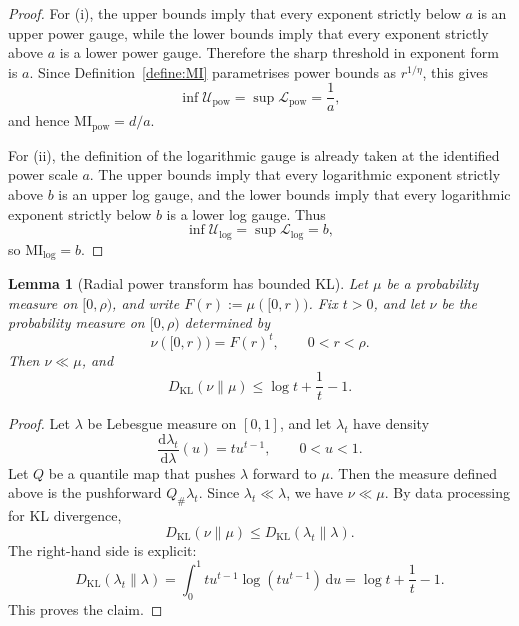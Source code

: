 \documentclass[11pt,a4paper]{article}
\newcommand{\MI}{\mathrm{MI}}
\theoremstyle{compactplain}
\newtheorem{lemma}[theorem]{Lemma}
\theoremstyle{compactdefinition}
\numberwithin{equation}{section}
\begin{document}
\begin{proof}
For \textnormal{(i)}, the upper bounds imply that every exponent strictly below
\(a\) is an upper power gauge, while the lower bounds imply that every exponent
strictly above \(a\) is a lower power gauge. Therefore the sharp threshold in
exponent form is \(a\). Since Definition~\ref{define:MI} parametrises power
bounds as \(r^{1/\eta}\), this gives
\[
 \inf\mathcal U_{\mathrm{pow}}=\sup\mathcal L_{\mathrm{pow}}=\frac1a,
\]
and hence \(\MI_{\mathrm{pow}}=d/a\).

For \textnormal{(ii)}, the definition of the logarithmic gauge is already taken
at the identified power scale \(a\). The upper bounds imply that every
logarithmic exponent strictly above \(b\) is an upper log gauge, and the lower
bounds imply that every logarithmic exponent strictly below \(b\) is a lower log
gauge. Thus
\[
 \inf\mathcal U_{\mathrm{log}}=\sup\mathcal L_{\mathrm{log}}=b,
\]
so \(\MI_{\mathrm{log}}=b\).
\end{proof}

\begin{lemma}[Radial power transform has bounded KL]
\label{lem:radial-power-kl}
Let \(\mu\) be a probability measure on \([0,\rho)\), and write
\(F(r):=\mu([0,r))\). Fix \(t>0\), and let \(\nu\) be the probability measure
on \([0,\rho)\) determined by
\[
 \nu([0,r))=F(r)^t,
 \qquad 0<r<\rho .
\]
Then \(\nu\ll\mu\), and
\[
 D_{\mathrm{KL}}(\nu\|\mu)
 \le
 \log t+\frac1t-1 .
\]
\end{lemma}

\begin{proof}
Let \(\lambda\) be Lebesgue measure on \([0,1]\), and let \(\lambda_t\) have
density
\[
 \frac{\mathrm d\lambda_t}{\mathrm d\lambda}(u)=t u^{t-1},
 \qquad 0<u<1 .
\]
Let \(Q\) be a quantile map that pushes \(\lambda\) forward to \(\mu\). Then the
measure defined above is the pushforward \(Q_\#\lambda_t\). Since
\(\lambda_t\ll\lambda\), we have \(\nu\ll\mu\). By data processing for KL
divergence,
\[
 D_{\mathrm{KL}}(\nu\|\mu)
 \le
 D_{\mathrm{KL}}(\lambda_t\|\lambda).
\]
The right-hand side is explicit:
\[
 D_{\mathrm{KL}}(\lambda_t\|\lambda)
 =\int_0^1t u^{t-1}\log(tu^{t-1})\,\mathrm d u
 =\log t+\frac1t-1 .
\]
This proves the claim.
\end{proof}
\end{document}

